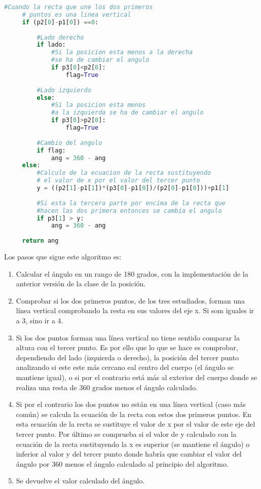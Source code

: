 {\begin{lstlisting}[language=Python]
     #Cuando la recta que une los dos primeros
     # puntos es una linea vertical
     if (p2[0]-p1[0]) ==0:
         
         #Lado derecho
         if lado:
             #Si la posicion esta menos a la derecha 
             #se ha de cambiar el angulo
             if p3[0]<p2[0]:
                 flag=True
         
         #Lado izquierdo
         else:
             #Si la posicion esta menos 
             #a la izquierda se ha de cambiar el angulo
             if p3[0]>p2[0]:
                 flag=True
         
         #Cambio del angulo
         if flag:
             ang = 360 - ang
     else:
         #Calculo de la ecuacion de la recta sustituyendo
         # el valor de x por el valor del tercer punto
         y = ((p2[1]-p1[1])*(p3[0]-p1[0])/(p2[0]-p1[0]))+p1[1]
         
         #Si esta la tercera parte por encima de la recta que 
         #hacen las dos primera entonces se cambia el angulo
         if p3[1] > y:
             ang = 360 - ang
     
     return ang
\end{lstlisting}

Los pasos que sigue este algoritmo es:
\begin{enumerate}
	\item Calcular el ángulo en un rango de 180 grados, con la implementación de la anterior versión de la clase de la posición.
	\item Comprobar si los dos primeros puntos, de los tres estudiados, forman una línea vertical comprobando la resta en sus valores del eje x. Si som iguales ir a 3, sino ir a 4.
	\item Si los dos puntos forman una línea vertical no tiene sentido comparar la altura con el tercer punto. Es por ello que lo que se hace es comprobar, dependiendo del lado (izquierda o derecho), la posición del tercer punto analizando si este este más cercano eal centro del cuerpo (el ángulo se mantiene igual), o si por el contrario está más al exterior del cuerpo donde se realiza una resta de 360 grados menos el ángulo calculado.
	\item Si por el contrario los dos puntos no están en una línea vertical (caso más común) se calcula la ecuación de la recta con estos dos primeros puntos. En esta ecuación de la recta se sustituye el valor de x por el valor de este eje del tercer punto. Por último se comprueba si el valor de y calculado con la ecuación de la recta sustituyendo la x es superior (se mantiene el ángulo) o inferior al valor y del tercer punto donde habría que cambiar el valor del ángulo por 360 menos el ángulo calculado al principio del algoritmo.
	\item Se devuelve el valor calculado del ángulo.
\end{enumerate}

}
